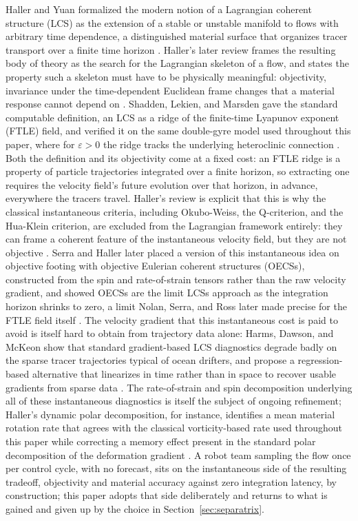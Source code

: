 \documentclass[lettersize,journal]{IEEEtran}
\begin{document}
Haller and Yuan formalized the modern notion of a Lagrangian coherent
structure (LCS) as the extension of a stable or unstable manifold to flows
with arbitrary time dependence, a distinguished material surface that
organizes tracer transport over a finite time horizon \cite{6}. Haller's later
review frames the resulting body of theory as the search for the Lagrangian
skeleton of a flow, and states the property such a skeleton must have to be
physically meaningful: objectivity, invariance under the time-dependent
Euclidean frame changes that a material response cannot depend on \cite{16}.
Shadden, Lekien, and Marsden gave the standard computable definition, an LCS
as a ridge of the finite-time Lyapunov exponent (FTLE) field, and verified it
on the same double-gyre model used throughout this paper, where for
$\varepsilon > 0$ the ridge tracks the underlying heteroclinic connection
\cite{8}. Both the definition and its objectivity come at a fixed cost: an FTLE
ridge is a property of particle trajectories integrated over a finite
horizon, so extracting one requires the velocity field's future evolution
over that horizon, in advance, everywhere the tracers travel. Haller's
review is explicit that this is why the classical instantaneous criteria,
including Okubo-Weiss, the Q-criterion, and the Hua-Klein criterion, are
excluded from the Lagrangian framework entirely: they can frame a coherent
feature of the instantaneous velocity field, but they are not objective
\cite{16}. Serra and Haller later placed a version of this instantaneous idea on
objective footing with objective Eulerian coherent structures (OECSs),
constructed from the spin and rate-of-strain tensors rather than the raw
velocity gradient, and showed OECSs are the limit LCSs approach as the
integration horizon shrinks to zero, a limit Nolan, Serra, and Ross later
made precise for the FTLE field itself \cite{17,18}. The velocity gradient
that this instantaneous cost is paid to avoid is itself hard to obtain from
trajectory data alone: Harms, Dawson, and McKeon show that standard
gradient-based LCS diagnostics degrade badly on the sparse tracer
trajectories typical of ocean drifters, and propose a regression-based
alternative that linearizes in time rather than in space to recover usable
gradients from sparse data \cite{19}. The rate-of-strain and spin decomposition
underlying all of these instantaneous diagnostics is itself the subject of
ongoing refinement; Haller's dynamic polar decomposition, for instance,
identifies a mean material rotation rate that agrees with the classical
vorticity-based rate used throughout this paper while correcting a
memory effect present in the standard polar decomposition of the
deformation gradient \cite{20}. A robot team sampling the flow once per
control cycle, with no forecast, sits on the instantaneous side of the
resulting tradeoff, objectivity and material accuracy against zero
integration latency, by construction; this paper adopts that side
deliberately and returns to what is gained and given up by the choice in
Section~\ref{sec:separatrix}.
\end{document}
